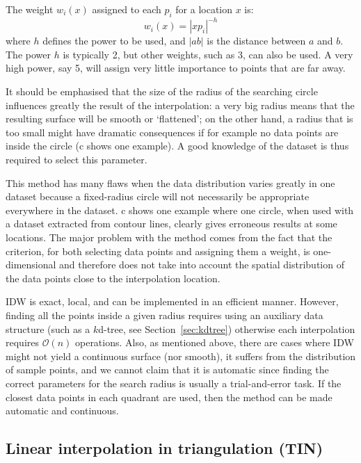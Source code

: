 The weight $w_i(x)$ assigned to each $p_i$ for a location $x$ is:
\begin{equation}
w_i(x) = |xp_i|^{-h}
\end{equation}
where $h$ defines the power to be used, and $|ab|$ is the distance between $a$ and $b$.
The power $h$ is typically 2, but other weights, such as 3, can also be used.
A very high power, say 5, will assign very little importance to points that are far away.

It should be emphasised that the size of the radius of the searching circle influences greatly the result of the interpolation: a very big radius means that the resulting surface will be smooth or `flattened'; on the other hand, a radius that is too small might have dramatic consequences if for example no data points are inside the circle (c shows one example).
A good knowledge of the dataset is thus required to select this parameter. 

This method has many flaws when the data distribution varies greatly in one dataset because a fixed-radius circle will not necessarily be appropriate everywhere in the data\-set. 
c shows one example where one circle, when used with a dataset extracted from contour lines, clearly gives erroneous results at some locations. 
The major problem with the method comes from the fact that the criterion, for both selecting data points and assigning them a weight, is one-dimensional and therefore does not take into account the spatial distribution of the data points close to the interpolation location.

IDW is exact, local, and can be implemented in an efficient manner.
However, finding all the points inside a given radius requires using an auxiliary data structure (such as a $k$d-tree, see Section~\ref{sec:kdtree}) otherwise each interpolation requires $\mathcal{O}(n)$ operations.
Also, as mentioned above, there are cases where IDW might not yield a continuous surface (nor smooth), it suffers from the distribution of sample points, and we cannot claim that it is automatic since finding the correct parameters for the search radius is usually a trial-and-error task.
If the closest data points in each quadrant are used, then the method can be made automatic and continuous.


\subsection{Linear interpolation in triangulation (\textbf{TIN})}

